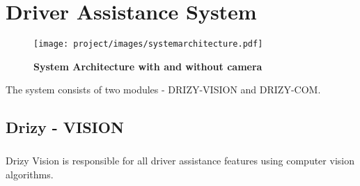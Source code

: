 \chapter{Driver Assistance System}
\begin{figure}[hbtp]
\centering
{
\vspace{0.1in}
\texttt{[image: project/images/systemarchitecture.pdf]}
\caption{\textbf{System Architecture with and without camera}}
\label{fig:architecture}
}
\end{figure}

The system consists of two modules - DRIZY-VISION and DRIZY-COM. 
\section{Drizy - VISION}
\paragraph{}Drizy Vision is responsible for all driver assistance features using computer vision algorithms.
